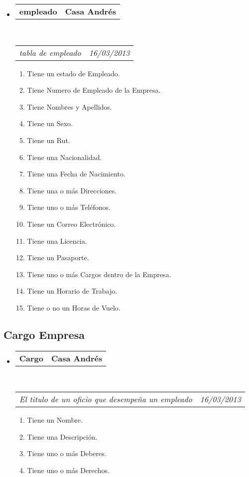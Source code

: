 \documentclass[10pt,letterpaper]{article}
\makeatletter
\newcommand{\headerrow}[2]
{\begin{tabular*}{\linewidth}{l@{\extracolsep{\fill}}r}
	#1 &
	#2 \\
\end{tabular*}}
\makeatother
\begin{document}
\begin{itemize}
	\parskip=0.1em

	\item
	\headerrow
		{\textbf{empleado}}
		{\textbf{Casa Andrés}}
	\\
	\headerrow
		{\emph{tabla de empleado}}
		{\emph{16/03/2013}}
	\begin{enumerate}
		\item Tiene un estado de Empleado.
		\item Tiene Numero de Empleado de la Empresa.
		\item Tiene Nombres y Apellidos.
		\item Tiene un Sexo.
		\item Tiene un Rut.
		\item Tiene una Nacionalidad.
		\item Tiene una Fecha de Nacimiento.
		\item Tiene una o más Direcciones.
		\item Tiene uno o más Teléfonos.
		\item Tiene un Correo Electrónico.
		\item Tiene una Licencia.
		\item Tiene un Pasaporte.
		\item Tiene uno o más Cargos dentro de la Empresa.
		\item Tiene un Horario de Trabajo.
		\item Tiene o no un Horas de Vuelo.
		
	\end{enumerate}

\end{itemize}


\subsection*{Cargo Empresa}

\begin{itemize}
	\parskip=0.1em

	\item
	\headerrow
		{\textbf{Cargo}}
		{\textbf{Casa Andrés}}
	\\
	\headerrow
		{\emph{El titulo de un oficio que desempeña un empleado}}
		{\emph{16/03/2013}}
	\begin{enumerate}
		\item Tiene un Nombre.
		\item Tiene una Descripción.
		\item Tiene uno o más Deberes.
		\item Tiene uno o más Derechos.
	\end{enumerate}

\end{itemize}
\end{document}

